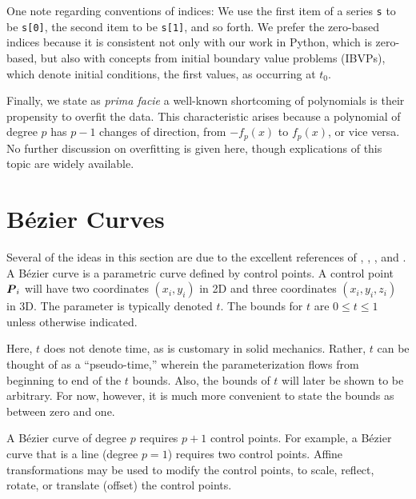 One note regarding conventions of indices:  We use the first
item of a series {\tt s} to be {\tt s[0]}, the second item to be 
{\tt s[1]}, and so forth.  We prefer the zero-based indices because 
it is consistent not only with our work in Python, which is zero-based, 
but also with concepts from initial boundary value problems (IBVPs), 
which denote initial conditions, the first values, as occurring at $t_0$.

Finally, we state as {\em prima facie} a well-known shortcoming of polynomials
is their propensity to overfit the data.  This characteristic arises because
a polynomial of degree $p$ has $p-1$ changes of direction, from $-f_p(x)$ to
$f_p(x)$, or vice versa.  No further discussion on overfitting is given here, 
though explications of this topic are widely available.  


\section{B\'ezier Curves}
\label{sec:bezier_curves}
Several of the ideas in this section are due to the excellent references
of \cite{Bartels-1995}, \cite{Piegl-2012}, \cite{Rogers-2000}, 
and \cite{Shiach-2015}.
A B\'ezier curve is a parametric curve defined by control points.
A control point $\mbox{\boldmath $P$}_i$ will have two coordinates $(x_i, y_i)$ in 2D and
three coordinates $(x_i, y_i, z_i)$ in 3D.
The parameter is typically denoted $t$.  The bounds for $t$ are 
$0 \leq t \leq 1$ unless otherwise indicated.

Here, $t$ does not denote time, as is customary in solid mechanics.  
Rather, $t$ can be thought of as a ``pseudo-time,'' wherein the 
parameterization flows from beginning to end of the $t$ bounds.
Also, the bounds of $t$ will later be shown to be arbitrary.  For now, 
however, it is much more convenient to state the bounds as between zero
and one.

A B\'ezier curve of degree $p$ requires $p+1$
control points. For example, a B\'ezier 
curve that is a line (degree $p=1$) requires two control points.
Affine transformations may be used to modify the control points, \eg to 
scale, reflect, rotate, or translate (offset) the control points.

